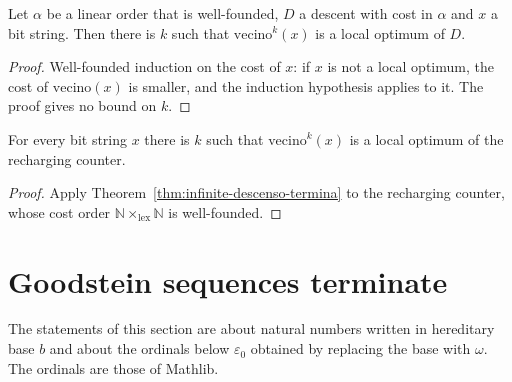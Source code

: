\begin{theorem}
  \label{thm:infinite-descenso-termina}
  \leanok
  \own{}
  \infrastructure{}
  Let $\alpha$ be a linear order that is well-founded, $D$ a descent with cost in $\alpha$ and $x$ a bit string. Then
  there is $k$ such that $\mathrm{vecino}^k(x)$ is a local optimum of $D$.
\end{theorem}

\begin{proof}
  \leanok
  Well-founded induction on the cost of $x$: if $x$ is not a local optimum, the cost of $\mathrm{vecino}(x)$ is smaller,
  and the induction hypothesis applies to it. The proof gives no bound on $k$.
\end{proof}

\begin{theorem}
  \label{thm:infinite-recarga-termina}
  \leanok
  \own{}
  \infrastructure{}
  For every bit string $x$ there is $k$ such that $\mathrm{vecino}^k(x)$ is a local optimum of the recharging counter.
\end{theorem}

\begin{proof}
  \leanok
  Apply Theorem~\ref{thm:infinite-descenso-termina} to the recharging counter, whose cost order
  $\mathbb{N} \times_{\mathrm{lex}} \mathbb{N}$ is well-founded.
\end{proof}

\section{Goodstein sequences terminate}
\label{sec:infinite-goodstein}

The statements of this section are about natural numbers written in hereditary base $b$ and about the ordinals
below $\varepsilon_0$ obtained by replacing the base with $\omega$. The ordinals are those of Mathlib.

